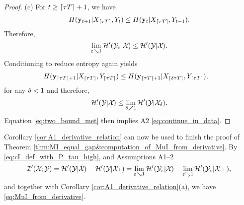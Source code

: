 \documentclass[12pt, draftclsnofoot,journal,onecolumn]{IEEEtran}
\begin{document}
\begin{proof}
(c) For $t\geq\lceil{\tau T}\rceil+1$, we have
\begin{align*}
  H({\mathbf{y}}_{t+1}|X_{\lceil{\tau T}\rceil},Y_{t}) \leq H({\mathbf{y}}_t|X_{\lceil{\tau T}\rceil},Y_{t-1}).
\end{align*}
Therefore,
\begin{equation*}
   \lim_{\varepsilon{\searrow} 1}{\mathcal{H}{'}}({\mathcal{Y}}_{\varepsilon}|{\mathcal{X}}_{})\leq {\mathcal{H}{'}}({\mathcal{Y}}_{}|{\mathcal{X}}_{}).
\end{equation*}
Conditioning to reduce entropy again yields
\begin{align*}
  H({\mathbf{y}}_{\lceil{\tau T}\rceil+1}|X_{\lceil{\tau T}\rceil},Y_{\lceil{\tau T}\rceil}) \leq&\; H({\mathbf{y}}_{\lceil{\tau T}\rceil+1}|X_{\lceil\delta{\tau T}\rceil},Y_{\lceil{\tau T}\rceil}),
\end{align*}
for any $\delta<1$ and therefore,
\begin{equation*}
    {\mathcal{H}{'}}({\mathcal{Y}}_{}|{\mathcal{X}}_{})\leq \lim_{\delta{\nearrow} 1}{\mathcal{H}{'}}({\mathcal{Y}}_{}|{\mathcal{X}}_{\delta}).
\end{equation*}
Equation \eqref{eq:two_bound_met} then implies A2 \eqref{eq:continue_in_data}.
\end{proof}

Corollary \ref{cor:A1_derivative_relation} can now be used to finish the proof of Theorem \ref{thm:MI_equal_gap&computation_of_MuI_from_derivative}. By \eqref{eq:cI_def_with_P_tau_high}, and Assumptions A1--2
\begin{equation*}
    \mathcal{I}{'}({\mathcal{X}}_{};{\mathcal{Y}}_{}) ={\mathcal{H}{'}}({\mathcal{Y}}_{}|{\mathcal{X}}_{}) - {\mathcal{H}{'}}({\mathcal{Y}}_{}|{\mathcal{X}}_{^+}) = \lim_{\varepsilon{\searrow} 1} {\mathcal{H}{'}}({\mathcal{Y}}_{\varepsilon}|{\mathcal{X}}_{}) - \lim_{\varepsilon{\searrow} 1} {\mathcal{H}{'}}({\mathcal{Y}}_{\varepsilon}|{\mathcal{X}}_{\varepsilon^+}),
\end{equation*}
and together with Corollary \ref{cor:A1_derivative_relation}(a), we have \eqref{eq:MuI_from_derivative}.
\end{document}
